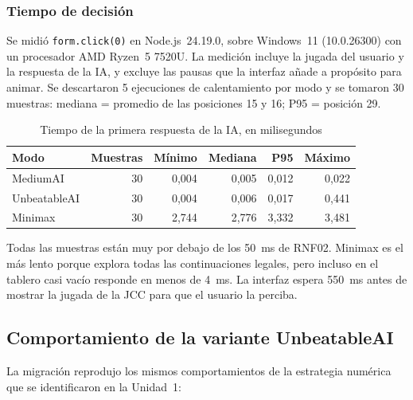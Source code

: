 \documentclass[12pt,a4paper]{article}
\begin{document}
\subsubsection{Tiempo de decisión}
Se midió \texttt{form.click(0)} en Node.js~24.19.0, sobre Windows~11
(10.0.26300) con un procesador AMD Ryzen~5 7520U. La medición incluye la jugada
del usuario y la respuesta de la IA, y excluye las pausas que la interfaz añade
a propósito para animar. Se descartaron 5 ejecuciones de calentamiento por modo
y se tomaron 30 muestras: mediana = promedio de las posiciones 15 y 16;
P95 = posición 29.
\begin{table}[H]
\centering\small
\caption{Tiempo de la primera respuesta de la IA, en milisegundos}
\begin{tabular}{lrrrrr}
\toprule Modo & Muestras & Mínimo & Mediana & P95 & Máximo\\\midrule
MediumAI & 30 & 0,004 & 0,005 & 0,012 & 0,022\\
UnbeatableAI & 30 & 0,004 & 0,006 & 0,017 & 0,441\\
Minimax & 30 & 2,744 & 2,776 & 3,332 & 3,481\\
\bottomrule
\end{tabular}
\end{table}
Todas las muestras están muy por debajo de los 50~ms de RNF02. Minimax es el más
lento porque explora todas las continuaciones legales, pero incluso en el tablero
casi vacío responde en menos de 4~ms. La interfaz espera 550~ms antes de mostrar
la jugada de la JCC para que el usuario la perciba.

\subsection{Comportamiento de la variante UnbeatableAI}\label{sec:hallazgos}
La migración reprodujo los mismos comportamientos de la estrategia numérica que
se identificaron en la Unidad~1:
\end{document}
